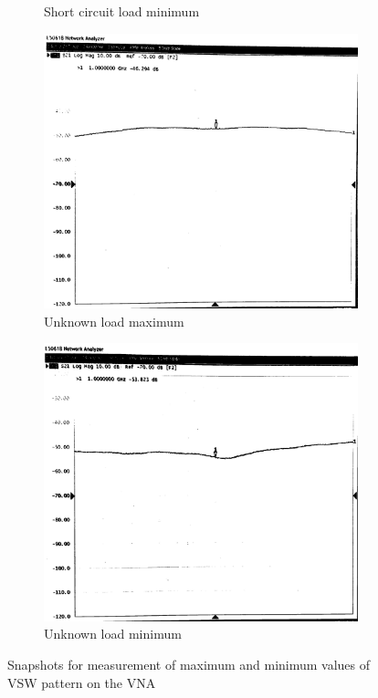 \documentclass[10pt]{article}
\begin{document}
\begin{figure}[ht]
\begin{subfigure}[b]{0.45\textwidth}
      \caption{Short circuit load minimum}
  \end{subfigure}
  \begin{subfigure}[b]{0.45\textwidth}
      \includegraphics[width=\textwidth]{../photos/lab2/unkwn-load-peak.jpg}
      \caption{Unknown load maximum}
  \end{subfigure}
  \quad
  \begin{subfigure}[b]{0.45\textwidth}
      \includegraphics[width=\textwidth]{../photos/lab2/unkwn-load-valley.jpg}
      \caption{Unknown load minimum}
  \end{subfigure}
  \caption{Snapshots for measurement of maximum and minimum values of VSW pattern on the VNA}
  \label{v_t_matched_tline}
\end{figure}
\end{document}
